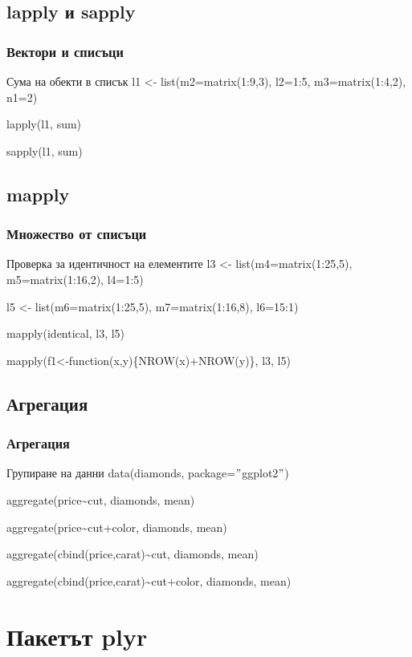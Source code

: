 \documentclass{beamer}
\begin{document}
\subsection{lapply и sapply}

\begin{frame}
\frametitle{Вектори и списъци}
\begin{block}{Сума на обекти в списък}
l1 <- list(m2=matrix(1:9,3), l2=1:5, m3=matrix(1:4,2), n1=2)

lapply(l1, sum)

sapply(l1, sum)
\end{block}
\end{frame}

\subsection{mapply}

\begin{frame}
\frametitle{Множество от списъци}
\begin{block}{Проверка за идентичност на елементите}
l3 <- list(m4=matrix(1:25,5), m5=matrix(1:16,2), l4=1:5)

l5 <- list(m6=matrix(1:25,5), m7=matrix(1:16,8), l6=15:1)

mapply(identical, l3, l5)

mapply(f1<-function(x,y)\{NROW(x)+NROW(y)\}, l3, l5)
\end{block}
\end{frame}

\subsection{Агрегация}

\begin{frame}
\frametitle{Агрегация}
\begin{block}{Групиране на данни}
data(diamonds, package=$"$ggplot2$"$)

aggregate(price\textasciitilde cut, diamonds, mean)

aggregate(price\textasciitilde cut+color, diamonds, mean)

aggregate(cbind(price,carat)\textasciitilde cut, diamonds, mean)

aggregate(cbind(price,carat)\textasciitilde cut+color, diamonds, mean)
\end{block}
\end{frame}

\section{Пакетът plyr}
\end{document}
